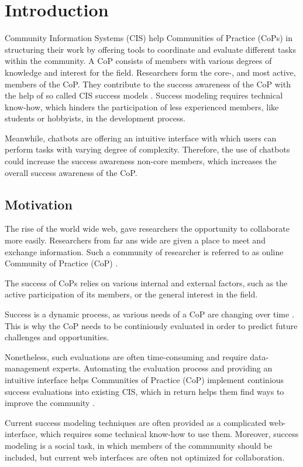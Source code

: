 \chapter{Introduction}
Community Information Systems (CIS) help Communities of Practice (CoPs) in structuring their work by offering tools to coordinate and evaluate different tasks within the community.
A CoP consists of members with various degrees of knowledge and interest for the field.
Researchers form the core-, and most active, members of the CoP.
They contribute to the success awareness of the CoP with the help of so called CIS success models \cite{Klam10c}.
Success modeling requires technical know-how, which hinders the participation of less experienced members, like students or hobbyists, in the development process.

Meanwhile, chatbots are offering an intuitive interface with which users can perform tasks with varying degree of complexity. Therefore, the use of chatbots could increase the success awareness non-core members, which increases the overall success awareness of the CoP.

\section{Motivation}
The rise of the world wide web, gave researchers the opportunity to collaborate more easily. Researchers from far ans wide are given a place to meet and exchange information. Such a community of researcher is referred to as online Community of Practice (CoP) \cite{Renz08}.

The success of CoPs relies on various internal and external factors, such as the active participation of its members, or the general interest in the field.

Success is a dynamic process, as various needs of a CoP are changing over time \cite{Renz08,GKJa08}.
This is why the CoP needs to be continiously evaluated in order to predict future challenges and opportunities.

Nonetheless, such evaluations are often time-consuming and require data-management experts.
Automating the evaluation process and providing an intuitive interface helps Communities of Practice (CoP) implement continious success evaluations into  existing CIS, which in return helps them find ways to improve the community \cite{Renz08}.

Current success modeling techniques are often provided as a complicated web-interface, which requires some technical know-how to use them.
Moreover, success modeling is a social task, in which members of the commmunity should be included, but current web interfaces are often not optimized for collaboration.

